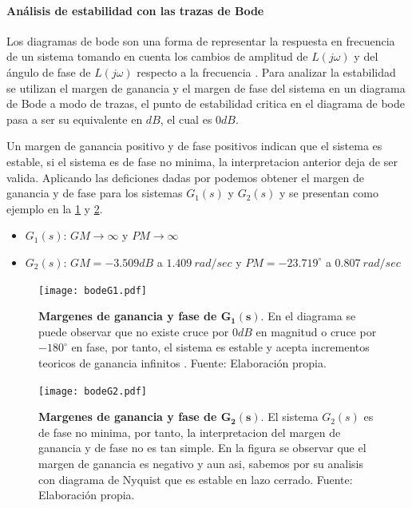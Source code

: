             \paragraph{Análisis de estabilidad con las trazas de Bode}

                Los diagramas de bode son una forma de representar la respuesta en frecuencia de un sistema tomando en cuenta los cambios de amplitud de $L(j\omega)$ y del ángulo de fase de $L(j\omega)$ respecto a la frecuencia \Parencite{nilsson1995circuitos}. Para analizar la estabilidad se utilizan el margen de ganancia y el margen de fase del sistema en un diagrama de Bode a modo de trazas, el punto de estabilidad critica en el diagrama de bode pasa a ser su equivalente en $dB$, el cual es $0dB$.

                Un margen de ganancia positivo y de fase positivos indican que el sistema es estable, si el sistema es de fase no minima, la interpretacion anterior deja de ser valida. Aplicando las deficiones dadas por \textcite{dorf2011modern} podemos obtener el margen de ganancia y de fase para los sistemas $G_1(s)$ y $G_2(s)$ y se presentan como ejemplo en la \cref{fig:bodeG1} y \cref{fig:bodeG2}.

                \begin{itemize}[leftmargin=\parindent]
                    \item $G_1(s)$: $GM \rightarrow \infty$ y $PM \rightarrow \infty$
                    \item $G_2(s)$: $GM = -3.509dB$ a $1.409\ rad/sec$ y $PM = -23.719^\circ$ a $0.807\ rad/sec$
                \end{itemize}

                \begin{figure}[htb]
                    \centering
                    \texttt{[image: bodeG1.pdf]}
                    \caption[Ejemplo 1 margenes de ganancia y fase]{\textbf{Margenes de ganancia y fase de $\pmb{G_1(s)}$}. En el diagrama se puede observar que no existe cruce por $0dB$ en magnitud o cruce por $-180^\circ$ en fase, por tanto, el sistema es estable y acepta incrementos teoricos de ganancia infinitos . Fuente: Elaboración propia.}
                    \label{fig:bodeG1}
                \end{figure}

                \begin{figure}[htb]
                    \centering
                    \texttt{[image: bodeG2.pdf]}
                    \caption[Ejemplo 2 margenes de ganancia y fase]{\textbf{Margenes de ganancia y fase de $\pmb{G_2(s)}$}. El sistema $G_2(s)$ es de fase no minima, por tanto, la interpretacion del margen de ganancia y de fase no es tan simple. En la figura se observar que el margen de ganancia es negativo y aun asi, sabemos por su analisis con diagrama de Nyquist que es estable en lazo cerrado. Fuente: Elaboración propia.} 
                    \label{fig:bodeG2}
                \end{figure}

